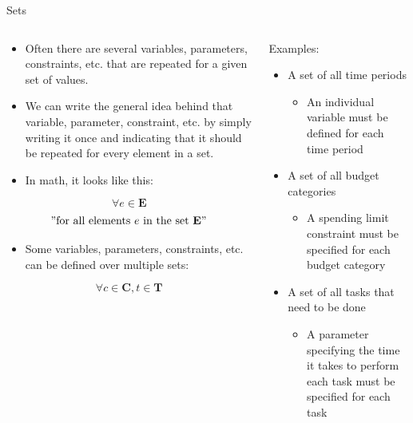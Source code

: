 \documentclass[10pt, aspectratio=169]{beamer}
\begin{document}
\begin{frame}{Sets}
    \begin{columns}
        \begin{column}{0.5\textwidth}
            \begin{itemize}
                \item Often there are several variables, parameters, constraints, etc. that are repeated for a given set of values.
                \item We can write the general idea behind that variable, parameter, constraint, etc. by simply writing it once and indicating that it should be repeated for every element in a set.
                \item In math, it looks like this:
            \end{itemize}
            $$\forall e \in \textbf{E}$$
            $$"\text{for all elements } e \text{ in the set } \textbf{E}"$$
            \begin{itemize}
                \item Some variables, parameters, constraints, etc. can be defined over multiple sets:
            \end{itemize}
            $$\forall c \in \textbf{C}, t \in \textbf{T}$$
        \end{column}
        \begin{column}{0.5\textwidth}
            Examples:
            \begin{itemize}
                \item A set of all time periods
                \begin{itemize}
                    \item An individual variable must be defined for each time period
                \end{itemize}
                \item A set of all budget categories
                \begin{itemize}
                    \item A spending limit constraint must be specified for each budget category
                \end{itemize}
                \item A set of all tasks that need to be done
                \begin{itemize}
                    \item A parameter specifying the time it takes to perform each task must be specified for each task
                \end{itemize}

\end{itemize}
\end{column}
\end{columns}
\end{frame}
\end{document}

